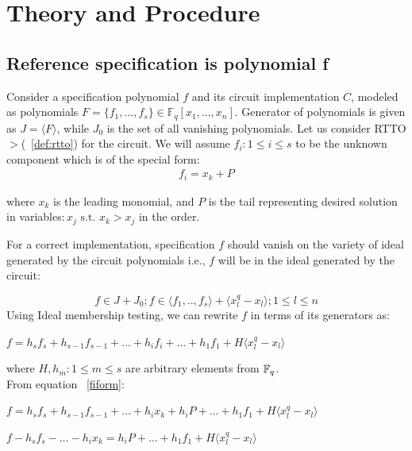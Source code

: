 \section{Theory and Procedure}
\label{sec:theory}
\subsection{Reference specification is polynomial f}
Consider a specification polynomial $f$ and its circuit implementation $C$, modeled as polynomials $F = \{f_1,\dots,f_s\}\in \mathbb{F}_q[x_1,\dots, x_n]$. Generator of polynomials is given as $J=\langle F \rangle$, while $J_0$ is the set of all vanishing polynomials. Let us consider RTTO$>$(~\ref{def:rtto}) for the circuit. We will assume $f_i:1\le i \le s$ to be the unknown component which is of the special form:
\begin{gather} 
\label{fiform}
f_i = x_k + P
\end{gather}

where $x_k$ is the leading monomial, and $P$ is the tail representing desired solution in variables$:x_j \text{ s.t. } x_k>x_j$ in the order. 

For a correct implementation, specification $f$ should vanish on the variety of ideal generated by the circuit polynomials i.e., $f$ will be in the ideal generated by the circuit:

\begin{equation}
\label{member}
f \in J + J_0; 
f \in \langle f_1,..,f_s\rangle + \langle x_l^q-x_l\rangle;1\le l \le n
\end{equation}
Using Ideal membership testing, we can rewrite $f$ in terms of its generators as:

$f = h_sf_s + h_{s-1}f_{s-1} +\dots+h_if_i+\dots+h_1f_1+H\langle x_l^q-x_l\rangle$

where $H, h_m:1\le m \le s$ are arbitrary elements from ${\mathbb{F}}_{q}$.\\
From equation ~\ref{fiform}:

{\small$f = h_sf_s + h_{s-1}f_{s-1} +\dots+h_ix_k+h_iP+\dots+h_1f_1+H\langle x_l^q-x_l\rangle$}

$f - h_sf_s -\dots-h_ix_k = h_iP+\dots+h_1f_1+H\langle x_l^q-x_l\rangle$

